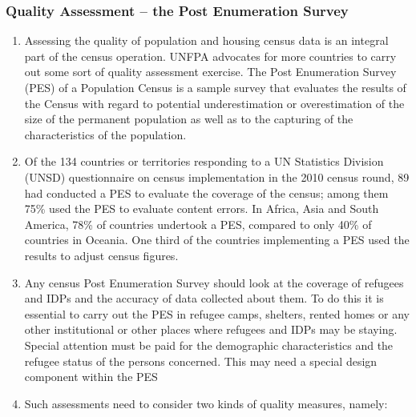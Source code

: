 \documentclass[
]{article}
\begin{document}
\hypertarget{a.1.-quality-assessment-the-post-enumeration-survey}{%
\subsubsection{Quality Assessment -- the Post Enumeration Survey}\label{a.1.-quality-assessment-the-post-enumeration-survey}}

\begin{enumerate}
\def\labelenumi{\arabic{enumi}.}
\setcounter{enumi}{107}
\item
  Assessing the quality of population and housing census data is an
  integral part of the census operation. UNFPA advocates for more
  countries to carry out some sort of quality assessment exercise. The
  Post Enumeration Survey (PES) of a Population Census is a sample
  survey that evaluates the results of the Census with regard to
  potential underestimation or overestimation of the size of the
  permanent population as well as to the capturing of the
  characteristics of the population.
\item
  Of the 134 countries or territories responding to a UN Statistics
  Division (UNSD) questionnaire on census implementation in the 2010
  census round, 89 had conducted a PES to evaluate the coverage of the
  census; among them 75\% used the PES to evaluate content errors. In
  Africa, Asia and South America, 78\% of countries undertook a PES,
  compared to only 40\% of countries in Oceania. One third of the
  countries implementing a PES used the results to adjust census
  figures.
\item
  Any census Post Enumeration Survey should look at the coverage of
  refugees and IDPs and the accuracy of data collected about them. To
  do this it is essential to carry out the PES in refugee camps,
  shelters, rented homes or any other institutional or other places
  where refugees and IDPs may be staying. Special attention must be
  paid for the demographic characteristics and the refugee status of
  the persons concerned. This may need a special design component
  within the PES
\item
  Such assessments need to consider two kinds of quality measures,
  namely:
\end{enumerate}
\end{document}
